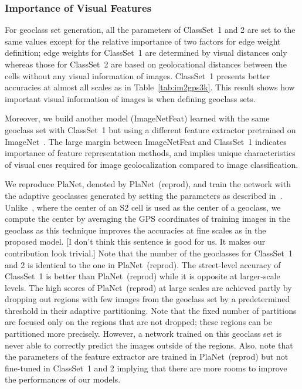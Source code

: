 \documentclass[runningheads]{llncs}
\begin{document}
\subsubsection{Importance of Visual Features}
For geoclass set generation, all the parameters of ClassSet~1 and 2 are set to the same values except for the relative importance of two factors for edge weight definition; edge weights for ClassSet~1 are determined by visual distances only whereas those for ClassSet~2 are based on geolocational distances between the cells without any visual information of images.
ClassSet~1 presents better accuracies at almost all scales as in Table~\ref{tab:im2gps3k}.
This result shows how important visual information of images is when defining geoclass sets.

Moreover, we build another model (ImageNetFeat) learned with the same geoclass set with ClassSet~1 but using a different feature extractor pretrained on ImageNet~\cite{Deng09ImageNet}.
The large margin between ImageNetFeat and ClassSet~1 indicates importance of feature representation methods, and implies unique characteristics of visual cues required for image geolocalization compared to image classification.


\iffalse
We reproduce PlaNet, denoted by PlaNet~(reprod), and {\color{red}train the network with the adaptive geoclasses generated by setting the parameters as described in~\cite{weyand16planet}.
Unlike~\cite{weyand16planet}, where the center of an S2 cell is used as the center of a geoclass, we compute the center by averaging the GPS coordinates of training images in the geoclass as this technique improves the accuracies at fine scales as in the proposed model. [I don't think this sentence is good for us. It makes our contribution look trivial.]}
Note that the number of the geoclasses for ClassSet~1 and 2 is identical to the one in PlaNet~(reprod).
The street-level accuracy of ClassSet~1 is better than PlaNet~(reprod) while it is opposite at larger-scale levels.
The high scores of PlaNet~(reprod) at large scales are achieved partly by dropping out regions with few images from the geoclass set by a predetermined threshold  in their adaptive partitioning.
Note that the fixed number of partitions are focused only on the regions that are not dropped; these regions can be partitioned more precisely.
However, a network trained on this geoclass set is never able to correctly predict the images outside of the regions.
Also, note that the parameters of the feature extractor are trained in PlaNet~(reprod) but not fine-tuned in ClassSet~1 and 2 implying that there are more rooms to improve the performances of our models.
\end{document}
